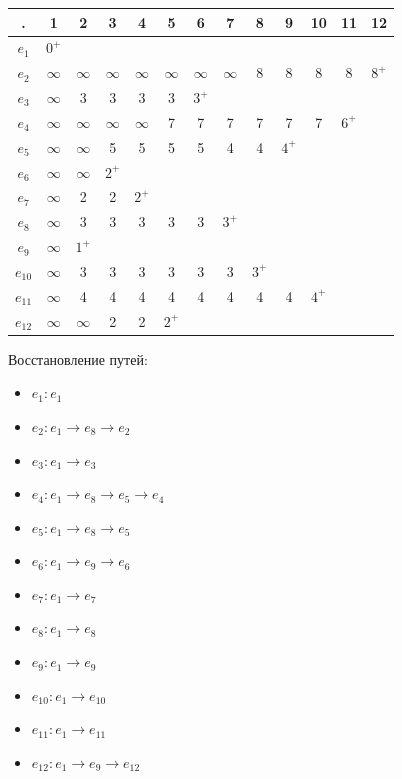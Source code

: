 \documentclass[a4paper,12pt]{article}
\begin{document}
\begin{table}[H]
    \centering
    \begin{tabular}{c|c|c|c|c|c|c|c|c|c|c|c|c}
        . & 1 & 2 & 3 & 4 & 5 & 6 & 7 & 8 & 9 & 10 & 11 & 12 \\ \hline
        $e_1$ & $0^+$ & ~ & ~ & ~ & ~ & ~ & ~ & ~ & ~ & ~ & ~ & ~ \\ \hline
        $e_2$ & $\infty$ & $\infty$ & $\infty$ & $\infty$ & $\infty$ & $\infty$ & $\infty$ & 8 & 8 & 8 & 8 & $8^+$ \\ \hline
        $e_3$ & $\infty$ & 3 & 3 & 3 & 3 & $3^+$ & ~ & ~ & ~ & ~ & ~ & ~ \\ \hline
        $e_4$ & $\infty$ & $\infty$ & $\infty$ & $\infty$ & 7 & 7 & 7 & 7 & 7 & 7 & $6^+$ & ~ \\ \hline
        $e_5$ & $\infty$ & $\infty$ & 5 & 5 & 5 & 5 & 4 & 4 & $4^+$ & ~ & ~ & ~ \\ \hline
        $e_6$ & $\infty$ & $\infty$ & $2^+$ & ~ & ~ & ~ & ~ & ~ & ~ & ~ & ~ & ~ \\ \hline
        $e_7$ & $\infty$ & 2 & 2 & $2^+$ & ~ & ~ & ~ & ~ & ~ & ~ & ~ & ~ \\ \hline
        $e_8$ & $\infty$ & 3 & 3 & 3 & 3 & 3 & $3^+$ & ~ & ~ & ~ & ~ & ~ \\ \hline
        $e_9$ & $\infty$ & $1^+$ & ~ & ~ & ~ & ~ & ~ & ~ & ~ & ~ & ~ & ~ \\ \hline
        $e_{10}$ & $\infty$ & 3 & 3 & 3 & 3 & 3 & 3 & $3^+$ & ~ & ~ & ~ & ~ \\ \hline
        $e_{11}$ & $\infty$ & 4 & 4 & 4 & 4 & 4 & 4 & 4 & 4 & $4^+$ & ~ & ~ \\ \hline
        $e_{12}$ & $\infty$ & $\infty$ & 2 & 2 & $2^+$ & ~ & ~ & ~ & ~ & ~ & ~ & ~ \\
    \end{tabular}
\end{table}
\noindent
Восстановление путей:
\begin{itemize}
    \item $e_1: e_1$
    \item $e_2: e_1 \to e_8 \to e_2$
    \item $e_3: e_1 \to e_3$
    \item $e_4: e_1 \to e_8 \to e_5 \to e_4$
    \item $e_5: e_1 \to e_8 \to e_5$
    \item $e_6: e_1 \to e_9 \to e_6$
    \item $e_7: e_1 \to e_7$
    \item $e_8: e_1 \to e_8$
    \item $e_9: e_1 \to e_9$
    \item $e_{10}: e_1 \to e_{10}$
    \item $e_{11}: e_1 \to e_{11}$
    \item $e_{12}: e_1 \to e_9 \to e_{12}$
\end{itemize}
\end{document}

